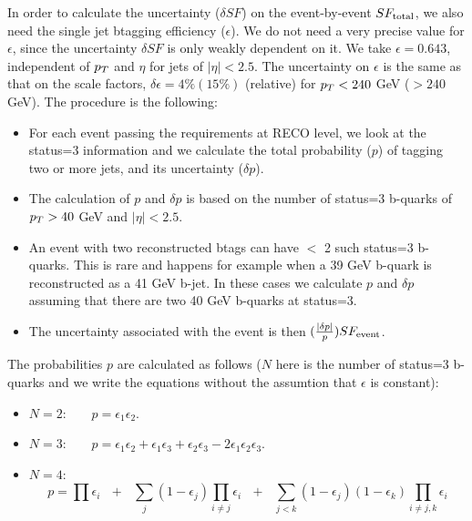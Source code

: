 In order to calculate the uncertainty ($\delta SF$) on the event-by-event $SF_{\rm total}$,
we also need the single jet btagging efficiency ($\epsilon$).  
We do not need a very precise value for $\epsilon$, since the uncertainty $\delta SF$ is 
only weakly dependent on it.  We take $\epsilon = 0.643$, independent of $p_T$
and $\eta$ for jets of $|\eta| < 2.5$.  The uncertainty on $\epsilon$ is 
the same as that on the scale factors, $\delta \epsilon = 4\% (15\%)$ (relative)
for $p_T < 240$ GeV ($> 240$ GeV).
The procedure is the following:
\begin{itemize}

\item For each event passing the requirements at RECO level, we look at the status=3 information
and we calculate the total probability ($p$) of tagging two or more jets, and 
its uncertainty ($\delta p$).

\item The calculation of $p$ and $\delta p$ is based on the number of status=3 b-quarks
of $p_T > 40$ GeV and $|\eta| < 2.5$.  

\item An event with two reconstructed btags can have $<$ 2 such status=3 b-quarks.  This 
is rare and happens for example when a 39 GeV b-quark is reconstructed as a 41 GeV
b-jet.  In these cases we calculate $p$ and $\delta p$ assuming that there are 
two 40 GeV b-quarks at status=3.

\item The uncertainty associated with the event is then $(\frac{|\delta p|}{p}) SF_{\rm event}$.

\end{itemize}

The probabilities $p$ are calculated as follows ($N$ here is the number of status=3 b-quarks
and we write the equations without the assumtion that $\epsilon$ is constant):

\begin{itemize}

\item $N=2$:~~~~$p = \epsilon_1 \epsilon_2$.

\item $N=3$:~~~~$p = \epsilon_1 \epsilon_2 + \epsilon_1 \epsilon_3 + \epsilon_2 \epsilon_3 -
2\epsilon_1 \epsilon_2 \epsilon_3$.

\item $N=4$:~~~~$$p = \prod{\epsilon_i}~~~+~~~\sum_j{(1-\epsilon_j)\prod_{i \ne j}{\epsilon_i}}
~~~+~~~\sum_{j<k}{(1-\epsilon_j)(1-\epsilon_k)\prod_{i \ne j,k}{\epsilon_i}}$$



\end{itemize}

